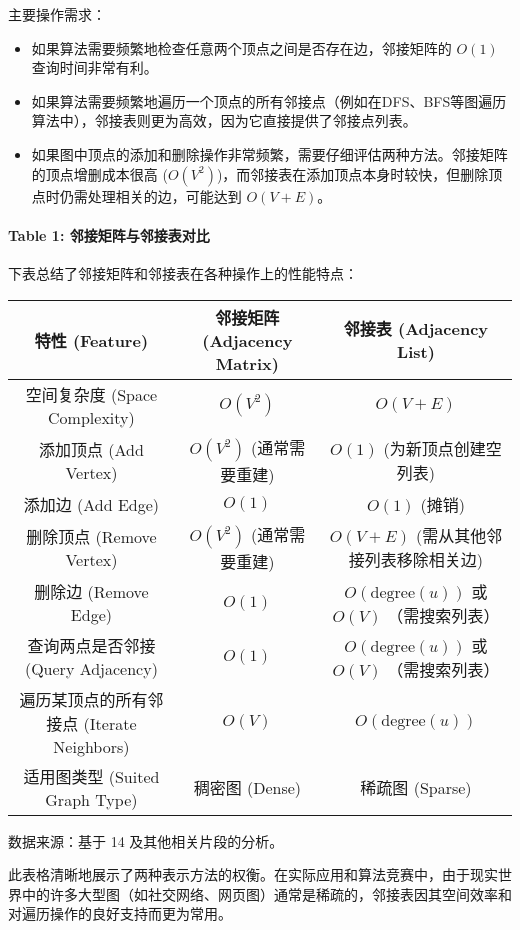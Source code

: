 主要操作需求：

\begin{itemize}
	\item 如果算法需要频繁地检查任意两个顶点之间是否存在边，邻接矩阵的 $O(1)$ 查询时间非常有利。
	\item 如果算法需要频繁地遍历一个顶点的所有邻接点（例如在DFS、BFS等图遍历算法中），邻接表则更为高效，因为它直接提供了邻接点列表。
	\item 如果图中顶点的添加和删除操作非常频繁，需要仔细评估两种方法。邻接矩阵的顶点增删成本很高 ($O(V^2)$)，而邻接表在添加顶点本身时较快，但删除顶点时仍需处理相关的边，可能达到 $O(V+E)$。
\end{itemize}

\paragraph{Table 1: 邻接矩阵与邻接表对比}

下表总结了邻接矩阵和邻接表在各种操作上的性能特点：

\begin{table}[h]
	\centering
	\begin{tabular}{|c|c|c|}
		\hline
		特性 (Feature) & 邻接矩阵 (Adjacency Matrix) & 邻接表 (Adjacency List) \\
		\hline
		空间复杂度 (Space Complexity) & $O(V^2)$ & $O(V+E)$ \\
		\hline
		添加顶点 (Add Vertex) & $O(V^2)$ (通常需要重建) & $O(1)$ (为新顶点创建空列表) \\
		\hline
		添加边 (Add Edge) & $O(1)$ & $O(1)$ (摊销) \\
		\hline
		删除顶点 (Remove Vertex) & $O(V^2)$ (通常需要重建) & $O(V+E)$ (需从其他邻接列表移除相关边) \\
		\hline
		删除边 (Remove Edge) & $O(1)$ & $O(\text{degree}(u))$ 或 $O(V)$ （需搜索列表） \\
		\hline
		查询两点是否邻接 (Query Adjacency) & $O(1)$ & $O(\text{degree}(u))$ 或 $O(V)$ （需搜索列表） \\
		\hline
		遍历某顶点的所有邻接点 (Iterate Neighbors) & $O(V)$ & $O(\text{degree}(u))$ \\
		\hline
		适用图类型 (Suited Graph Type) & 稠密图 (Dense) & 稀疏图 (Sparse) \\
		\hline
	\end{tabular}
\end{table}
数据来源：基于 14 及其他相关片段的分析。

此表格清晰地展示了两种表示方法的权衡。在实际应用和算法竞赛中，由于现实世界中的许多大型图（如社交网络、网页图）通常是稀疏的，邻接表因其空间效率和对遍历操作的良好支持而更为常用。

